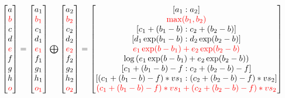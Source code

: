 $
\begin{bmatrix}
  a \\
  \textcolor{red}{b} \\
  c \\
  d \\
  \textcolor{red}{e} \\
  f \\
  g \\
  h \\
  \textcolor{red}{o}
\end{bmatrix} = 
\begin{bmatrix}
  a_1 \\
  \textcolor{red}{b_1} \\
  c_1 \\
  d_1 \\
  \textcolor{red}{e_1} \\
  f_1 \\
  g_1 \\
  h_1 \\
  \textcolor{red}{o_1}
\end{bmatrix} \bigoplus
\begin{bmatrix}
a_2 \\
\textcolor{red}{b_2} \\
c_2 \\
d_2 \\
\textcolor{red}{e_2} \\
f_2 \\
g_2 \\
h_2 \\
\textcolor{red}{o_2}
\end{bmatrix} = 
\begin{bmatrix}
[a_1:a_2] \\
\textcolor{red}{\max(b_1, b_2)} \\
\left[c_1 + (b_1 - b) : c_2 + (b_2 - b)\right] \\
\left[d_1 \exp(b_1 - b):d_2 \exp (b_2 - b)\right] \\
\textcolor{red}{e_1 \exp(b-b_1)+ e_2 \exp(b_2 -b)} \\
\log\left(e_1 \exp(b-b_1) + e_2 \exp(b_2 -b)\right) \\
\left[c_1+(b_1 - b)-f: c_2 + (b_2 - b) -f\right]\\
\left[(c_1+(b_1 - b) - f)*vs_1 :  (c_2+(b_2 - b) - f)*vs_2 \right]\\
\textcolor{red}{(c_1+(b_1 - b) - f)*vs_1 + (c_2+(b_2 - b) - f)*vs_2 }\\
\end{bmatrix}
$

